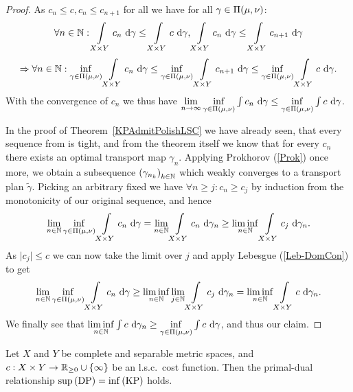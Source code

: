 \begin{proof}
	As $c_n \le c, c_n \le c_{n + 1}$ for all \NinN{} we have for all $\gamma \in \TP{\mu}{\nu}$:
	\[ \forall \NinN: \int\limits_{X \times Y} c_n~\D[\gamma] \le \int\limits_{X \times Y} c~\D[\gamma], \int\limits_{X \times Y} c_n~\D[\gamma] \le \int\limits_{X \times Y} c_{n + 1}~\D[\gamma] \]
	\[ \Rightarrow \forall \NinN: \inf\limits_{\gamma \in \TP{\mu}{\nu}} \int\limits_{X \times Y} c_n~\D[\gamma] \le \inf\limits_{\gamma \in \TP{\mu}{\nu}} \int\limits_{X \times Y} c_{n + 1}~\D[\gamma] \le \inf\limits_{\gamma \in \TP{\mu}{\nu}} \int\limits_{X \times Y} c~\D[\gamma]. \]
	With the convergence of $c_n$ we thus have $\lim\limits_{\Ninf} \inf\limits_{\gamma \in \TP{\mu}{\nu}} \int c_n~\D[\gamma] \le \inf\limits_{\gamma \in \TP{\mu}{\nu}} \int c~\D[\gamma]$.

	In the proof of Theorem~\ref{KPAdmitPolishLSC} we have already seen, that every sequence from \TP{\mu}{\nu} is tight, and from the theorem itself we know that for every $c_n$ there exists an optimal transport map $\gamma_n$. Applying Prokhorov (\ref{Prok}) once more, we obtain a subsequence ${(\gamma_{n_k})}_{\NinN[k]}$ which weakly converges to a transport plan $\tilde{\gamma}$. Picking an arbitrary fixed \NinN[j] we have $\forall n \ge j: c_n \ge c_j$ by induction from the monotonicity of our original sequence, and hence
	\[ \lim\limits_{\NinN} \inf\limits_{\gamma \in \TP{\mu}{\nu}} \int\limits_{X \times Y} c_n~\D[\gamma] = \lim\limits_{\NinN} \int\limits_{X \times Y} c_n~\D[\gamma_n] \ge \liminf\limits_{\NinN} \int\limits_{X \times Y} c_j~\D[\gamma_n]. \]
	As $\vert c_j \vert \le c$ we can now take the limit over $j$ and apply Lebesgue (\ref{Leb-DomCon}) to get
	\[ \lim\limits_{\NinN} \inf\limits_{\gamma \in \TP{\mu}{\nu}} \int\limits_{X \times Y} c_n~\D[\gamma] \ge \liminf\limits_{\NinN} \lim\limits_{\NinN[j]} \int\limits_{X \times Y} c_j~\D[\gamma_n] = \liminf\limits_{\NinN} \int\limits_{X \times Y} c~\D[\gamma_n]. \]
	We finally see that $\liminf\limits_{\NinN} \int c~\D[\gamma_n] \ge \inf\limits_{\gamma \in \TP{\mu}{\nu}} \int c~\D[\gamma]$, and thus our claim.
\end{proof}

\begin{theorem}\label{GenPDRel}
	Let $X$ and $Y$ be complete and separable metric spaces, and $\map[c]{X \times Y}{\RZero \cup \{ \infty \}}$ be an l.s.c.\ cost function. Then the primal-dual relationship $\sup\!\text{\normalfont\,(DP)} = \inf\!\text{\normalfont\,(KP)}$ holds.
\end{theorem}

